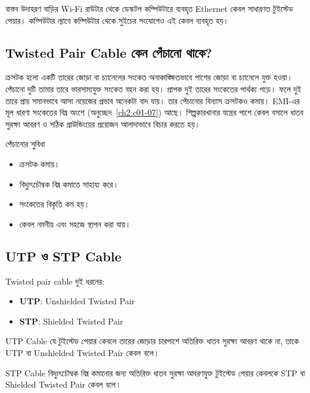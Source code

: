 \begin{examplebox}{বাস্তব উদাহরণ}
বাড়ির Wi-Fi রাউটার থেকে ডেস্কটপ কম্পিউটারে ব্যবহৃত Ethernet কেবল সাধারণত টুইস্টেড পেয়ার। কম্পিউটার ল্যাবে কম্পিউটার থেকে সুইচের সংযোগেও এই কেবল ব্যবহৃত হয়।
\end{examplebox}

\subsection{Twisted Pair Cable কেন পেঁচানো থাকে?}

ক্রসটক হলো একটি তারের জোড়া বা চ্যানেলের সংকেত অনাকাঙ্ক্ষিতভাবে পাশের জোড়া বা চ্যানেলে যুক্ত হওয়া। পেঁচানো দুটি তামার তারে ভারসাম্যযুক্ত সংকেত বহন করা হয়। প্রাপক দুই তারের সংকেতের পার্থক্য পড়ে। ফলে দুই তারে প্রায় সমানভাবে আসা নয়েজের প্রভাব অনেকটা বাদ যায়। তার পেঁচানোর বিন্যাস ক্রসটকও কমায়। EMI-এর মূল ধারণা সংকেতের বিঘ্ন অংশে (অনুচ্ছেদ~\ref{ch2:c01-07}) আছে। শিল্পকারখানার যন্ত্রের পাশে কেবল বসালে ধাতব সুরক্ষা আবরণ ও সঠিক গ্রাউন্ডিংয়ের প্রয়োজন আলাদাভাবে বিচার করতে হয়।

\begin{keypointbox}{পেঁচানোর সুবিধা}
\begin{itemize}
\item ক্রসটক কমায়।
\item বিদ্যুৎচৌম্বক বিঘ্ন কমাতে সাহায্য করে।
\item সংকেতের বিকৃতি কম হয়।
\item কেবল নমনীয় এবং সহজে স্থাপন করা যায়।
\end{itemize}
\end{keypointbox}

\subsection{UTP ও STP Cable}

Twisted pair cable দুই ধরনের:

\begin{itemize}
\item \textbf{UTP}: Unshielded Twisted Pair
\item \textbf{STP}: Shielded Twisted Pair
\end{itemize}

\begin{definitionbox}{UTP Cable}
যে টুইস্টেড পেয়ার কেবলে তারের জোড়ার চারপাশে অতিরিক্ত ধাতব সুরক্ষা আবরণ থাকে না, তাকে UTP বা Unshielded Twisted Pair কেবল বলে।
\end{definitionbox}

\begin{definitionbox}{STP Cable}
বিদ্যুৎচৌম্বক বিঘ্ন কমানোর জন্য অতিরিক্ত ধাতব সুরক্ষা আবরণযুক্ত টুইস্টেড পেয়ার কেবলকে STP বা Shielded Twisted Pair কেবল বলে।
\end{definitionbox}

